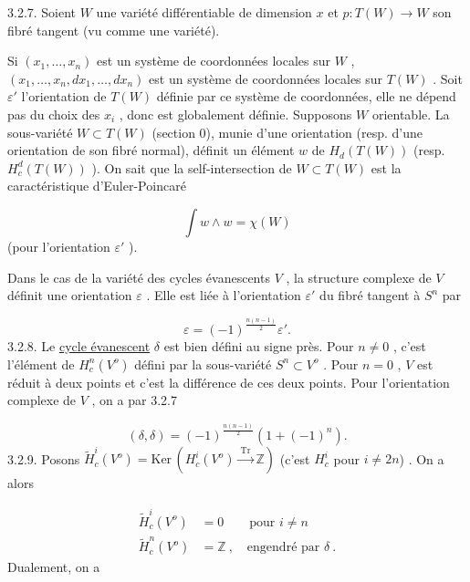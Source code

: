 3.2.7. Soient $W$ une variété différentiable de dimension $x$ et $p : T(W) \to W$ son fibré tangent (vu comme une variété).



Si $(x_1,\ldots,x_n)$ est un système de coordonnées locales sur $W$ , $(x_1,\ldots,x_n, dx_1,\ldots,dx_n)$ est un système de coordonnées locales sur $T(W)$ . Soit $\varepsilon'$ l'orientation de $T(W)$ définie par ce système de coordonnées, elle ne dépend pas du choix des $x_i$ , donc est globalement définie. Supposons $W$ orientable. La sous-variété $W \subset T(W)$ (section 0), munie d'une orientation (resp. d'une orientation de son fibré normal), définit un élément $w$ de $H_d(T(W))$ (resp. $H^d_c(T(W))$ ). On sait que la self-intersection de $W \subset T(W)$ est la caractéristique d'Euler-Poincaré

\begin{equation*}
\int w \wedge w = \chi(W)
\end{equation*}
(pour l'orientation $\varepsilon'$ ).

Dans le cas de la variété des cycles évanescents $V$ , la structure complexe de $V$ définit une orientation $\varepsilon$ . Elle est liée à l'orientation $\varepsilon'$ du fibré tangent à $S^n$ par

\begin{equation*}
\varepsilon = (-1)^{\frac{n(n-1)}{2}} \varepsilon' .
\end{equation*}
3.2.8. Le \underline{cycle évanescent} $\delta$ est bien défini au signe près. Pour $n \neq 0$ , c'est l'élément de $H^n_c(V^o)$ défini par la sous-variété $S^n \subset V^o$ . Pour $n = 0$ , $V$ est réduit à deux points et c'est la différence de ces deux points. Pour l'orientation complexe de $V$ , on a par 3.2.7

\begin{equation}\tag{3.2.8.1}
(\delta, \delta) = (-1)^{\frac{n(n-1)}{2}} (1 + (-1)^n) .
\end{equation}
3.2.9. Posons $\widetilde{H}^i_c(V^o) = \mathrm{Ker}\, (H^i_c(V^o) \xrightarrow{\ \mathrm{Tr}\ } \mathbb{Z})$ (c'est $H^i_c$ pour $i \neq 2n$) . On a alors

\begin{equation*}
\begin{aligned} \widetilde{H}^i_c(V^o) &= 0 \qquad \text{pour } i \neq n \\ \widetilde{H}^n_c(V^o) &= \mathbb{Z} \ , \quad \text{engendré par } \delta \ . \end{aligned}
\end{equation*}
Dualement, on a

